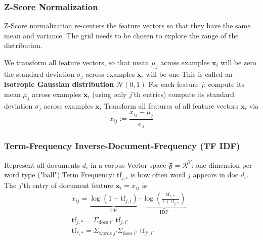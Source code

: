 \documentclass{article}
\renewcommand{\vec}[1]{%
	\mathbf{#1}%
}
\begin{document}
	\subsubsection{Z-Score Normalization}
	Z-Score normalization re-centers the feature vectors so that they have the same mean and variance. The grid needs to be chosen to explore the range of the distribution.
	\begin{outline}
		\1 We transform all feature vectors, so that
		\2 mean $\mu_j$ across examples $\vec{x}_i$ will be zero
		\2 the standard deviation $\sigma_j$ across examples $\vec{x}_i$ will be one
		\1 This is called an \textbf{isotropic Gaussian distribution} $\mathcal{N}(0,1)$
		\1 For each feature $j$:
		\2 compute its mean $\mu_j$ across examples $\vec{x}_i$ (using only $j$'th entries)
		\2 compute its standard deviation $\sigma_j$ across examples $\vec{x}_i$
		\1 Transform all features of all feature vectors $\vec{x}_i$ via
		\begin{equation*}
			x_{ij} := \frac{x_{ij} - \mu_j}{\sigma_j}
		\end{equation*}
	\end{outline}
	\subsubsection{Term-Frequency Inverse-Document-Frequency (TF IDF)}
	\begin{outline}
		\1 Represent all documents $d_i$ in a corpus
		\1 Vector space $\mathfrak{F} = \mathcal{R}^V$: one dimension per word type ("ball")
		\1[]
		\1 Term Frequency: $\text{tf}_{j,i}$ is how often word $j$ appears in doc $d_i$.
		\1 The $j$'th entry of document feature $\vec{x}_i = x_{ij}$ is
		\begin{align*}
			& x_{ij} = \underbrace{\log(1 + \text{tf}_{j,i})}_{\text{TF}} \cdot \underbrace{\log(\frac{\text{tf}_{*,*}}{1 + \text{tf}_{j,*}})}_{\text{IDF}} && \\
			& \text{tf}_{j,*} = \Sigma_{\text{docs } i'} \text{ tf}_{j,i'} && \\
			& \text{tf}_{*,*} = \Sigma_{\text{words } j'} \Sigma_{\text{docs } i'} \text{ tf}_{j',i'} &&
		\end{align*}
	\end{outline}
\end{document}
